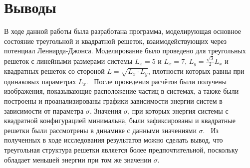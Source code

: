 \documentclass[14pt,a4paper,report]{ncc}
\begin{document}
\newpage\section{Выводы}
В ходе данной работы была разработана программа, моделирующая основное состояние треугольной и квадратной решеток, взаимодействующих через потенциал Леннарда-Джонса. Моделирование было проведено для треугольных решеток с линейными размерами системы $L_x=5$ и $L_x=7$, $L_y=\frac{\sqrt{3}}{2} L_x$ и квадратных решеток со стороной $L=\sqrt{L_x \cdot L_y}$, плотности которых равны при одинаковых параметрах $L_x$. 
\
После проведения расчётов были получены изображения,
показывающие расположение частиц в системах, а также были построены и проанализированы графики зависимости энергии систем в зависимости от параметра $\sigma$. Значения $\sigma$, при которых энергия системы с квадратной конфигурацией минимальна, были зафиксированы и квадратные решетки были рассмотрены в динамике с данными значениями $\sigma$. 
\
Из полученных в ходе исследования результатов можно сделать вывод, что треугольная структура решетки является более предпочтительной, поскольку обладает меньшей энергии при том же значении $\sigma$. 
\end{document}
